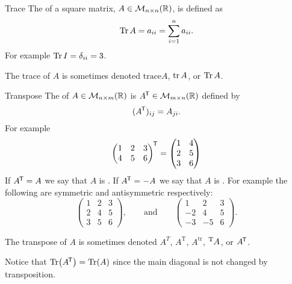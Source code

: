 \begin{definition}{Trace}{}
    The  of a square matrix, \(A \in\mathcal{M}_{{n}\times{n}}({\mathbb{R}})\), is defined as
    \[\Tr A = a_{ii} = \sum_{i=1}^{n} a_{ii}.\]
    For example \(\Tr I = \delta_{ii} = 3\).
\end{definition}
\begin{notation*}{}
    The trace of \(A\) is sometimes denoted \(\mathrm{trace}A\), \(\tr A\), or \(\Tr A\).
\end{notation*}
\begin{definition}{Transpose}{}
    The  of \(A\in\mathcal{M}_{{n}\times{m}}({\mathbb{R}})\) is \(A^{\mkern-1.5mu\mathsf{T}}\in\mathcal{M}_{{m}\times{n}}({\mathbb{R}})\) defined by
    \[(A^{\mkern-1.5mu\mathsf{T}})_{ij} = A_{ji}.\]
    For example
    \[
    \begin{pmatrix}
        1 & 2 & 3\\
        4 & 5 & 6
    \end{pmatrix}
    ^{\mkern-1.5mu\mathsf{T}}
    =
    \begin{pmatrix}
        1 & 4\\
        2 & 5\\
        3 & 6
    \end{pmatrix}
    \]
    If \(A^{\mkern-1.5mu\mathsf{T}} = A\) we say that \(A\) is .
    If \(A^{\mkern-1.5mu\mathsf{T}} = -A\) we say that \(A\) is .
    For example the following are symmetric and antisymmetric respectively:
    \[
    \begin{pmatrix}
        1 & 2 & 3\\
        2 & 4 & 5\\
        3 & 5 & 6
    \end{pmatrix}
    , \qquad\text{and}\qquad
    \begin{pmatrix}
        1 & 2 & 3\\
        -2 & 4 & 5\\
        -3 & -5 & 6
    \end{pmatrix}
    .
    \]
\end{definition}
\begin{notation}
    The transpose of \(A\) is sometimes denoted \(A^T\), \(A^{\mathrm{T}}\), \(A^{\mathrm{tr}}\), \(\tensor[^{\mathrm{T}}]{A}{}\), or \(A^{\mkern-1.5mu\mathsf{T}}\).
\end{notation}
Notice that \(\Tr(A^{\mkern-1.5mu\mathsf{T}}) = \Tr(A)\) since the main diagonal is not changed by transposition.
